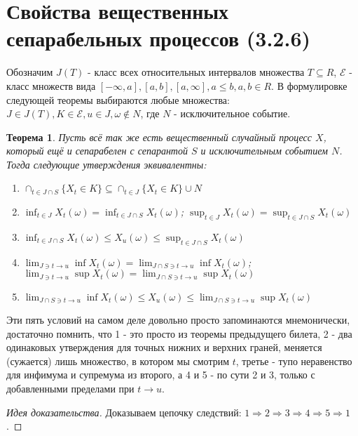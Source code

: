 \documentclass[16pt]{article}
\newtheorem{theorem}{Теорема}[section]
\theoremstyle{definition}
\begin{document}
\section{Свойства вещественных сепарабельных процессов (3.2.6)}
Обозначим $J(T)$ - класс всех относительных интервалов множества $T \subseteq R$, $\mathcal{E}$ - класс множеств вида $[-\infty, a], [a, b], [a, \infty], a \le b, a,b \in R$. В формулировке следующей теоремы выбираются любые множества: $J \in J(T), K \in \mathcal{E}, u \in J, \omega \notin N$, где $N$ - исключительное событие. 
\begin{theorem}
Пусть всё так же есть вещественный случайный процесс $X$, который ещё и сепарабелен с сепарантой $S$ и исключительным событием $N$. Тогда следующие утверждения эквивалентны:
\begin{enumerate}
    \item $\cap_{t \in J \cap S}\{X_t \in K\} \subseteq \cap_{t \in J}\{X_t \in K\} \cup N$
    \item $\inf_{t \in J}X_t(\omega) = \inf_{t \in J \cap S}X_t(\omega)$; \newline $\sup_{t \in J}X_t(\omega) = \sup_{t \in J \cap S}X_t(\omega)$
    \item $\inf_{t \in J \cap S}X_t(\omega) \le X_u(\omega) \le \sup_{t \in J \cap S}X_t(\omega)$
    \item $\lim_{J \ni t \rightarrow u} \inf X_t(\omega) = \lim_{J \cap S \ni t \rightarrow u} \inf X_t(\omega)$; \newline $\lim_{J \ni t \rightarrow u} \sup X_t(\omega) = \lim_{J \cap S \ni t \rightarrow u} \sup X_t(\omega)$
    \item $\lim_{J \cap S \ni t \rightarrow u} \inf X_t(\omega) \le X_u(\omega) \le \lim_{J \cap S \ni t \rightarrow u} \sup X_t(\omega)$
\end{enumerate}
\end{theorem}
Эти пять условий на самом деле довольно просто запоминаются мнемонически, достаточно помнить, что 1 - это просто из теоремы предыдущего билета, 2 - два одинаковых утверждения для точных нижних и верхних граней, меняется (сужается) лишь множество, в котором мы смотрим $t$, третье - тупо неравенство для инфимума и супремума из второго, а 4 и 5 - по сути 2 и 3, только с добавленными пределами при $t \rightarrow u$.
\begin{proof}[Идея доказательства]
Доказываем цепочку следствий: $1 \Longrightarrow 2 \Longrightarrow 3 \Longrightarrow 4 \Longrightarrow 5 \Longrightarrow 1$.
\end{proof}
\end{document}
